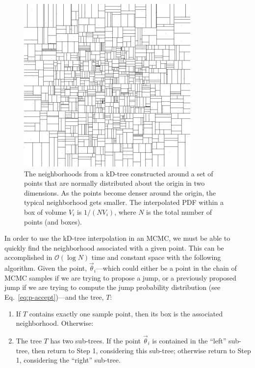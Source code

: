 \documentclass[prd,preprint]{revtex4}
\newcommand{\vtheta}{\vec{\theta}}
\newcommand{\order}[1]{\mathcal{O}\left( #1 \right)}
\begin{document}
\begin{figure}
  \begin{center}
    \includegraphics[width=0.8\textwidth]{kdtree.png}
  \end{center}
  \caption{\label{fig:kD-tree} The neighborhoods from a kD-tree
    constructed around a set of points that are normally distributed
    about the origin in two dimensions.  As the points become denser
    around the origin, the typical neighborhood gets smaller.  The
    interpolated PDF within a box of volume $V_i$ is $1/(N V_i)$,
    where $N$ is the total number of points (and boxes).}
\end{figure}

In order to use the kD-tree interpolation in an MCMC, we must be able
to quickly find the neighborhood associated with a given point.  This
can be accomplished in $\order{\log N}$ time and constant space with
the following algorithm.  Given the point, $\vtheta_i$---which could
either be a point in the chain of MCMC samples if we are trying to
propose a jump, or a previously proposed jump if we are trying to
compute the jump probability distribution (see
Eq.~\ref{eq:p-accept})---and the tree, $T$:
\begin{enumerate}
\item If $T$ contains exactly one sample point, then its box is the
  associated neighborhood.  Otherwise:
\item The tree $T$ has two sub-trees.  If the point $\vtheta_i$ is
  contained in the ``left'' sub-tree, then return to Step 1,
  considering this sub-tree; otherwise return to Step 1, considering
  the ``right'' sub-tree.
\end{enumerate}
\end{document}
